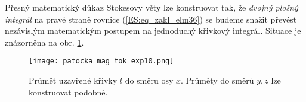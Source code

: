           
        
        Přesný matematický důkaz Stokesovy věty lze konstruovat tak, že \emph{dvojný plošný 
        integrál} na pravé straně rovnice (\ref{ES:eq_zakl_elm36}) se budeme snažit převést 
        nezávislým matematickým postupem na jednoduchý křivkový integrál. Situace je znázorněna na 
        obr. \ref{es:fig_patocka_mag_tok_exp10}.
        
        \begin{figure}[ht!]
          \centering
          \texttt{[image: patocka\_mag\_tok\_exp10.png]}
          \caption{Průmět uzavřené křivky \(l\) do směru osy \(x\). Průměty do směrů \(y, z\) lze 
                   konstruovat podobně.}
          \label{es:fig_patocka_mag_tok_exp10}
        \end{figure}
        
